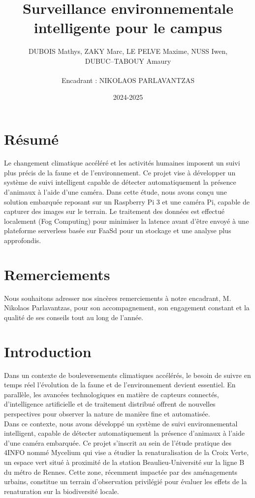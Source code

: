 \documentclass[a4paper,11pt]{article}
\title{\textbf{Surveillance environnementale intelligente pour le campus}}
\author{DUBOIS Mathys,	ZAKY Marc,	LE PELVE Maxime,	NUSS Iwen,\\	DUBUC--TABOUY Amaury
	\\ \\
	Encadrant : NIKOLAOS PARLAVANTZAS}
\date{2024-2025}                    %
\begin{document}
	
	\maketitle
	\section*{Résumé}
	Le changement climatique accéléré et les activités humaines imposent un suivi plus précis de la faune et de l'environnement. Ce projet vise à développer un système de suivi intelligent capable de détecter automatiquement la présence d'animaux à l'aide d'une caméra. Dans cette étude, nous avons conçu une solution embarquée reposant sur un Raspberry Pi 3 et une caméra Pi, capable de capturer des images sur le terrain. Le traitement des données est effectué localement (Fog Computing) pour minimiser la latence avant d'être envoyé à une plateforme serverless basée sur FaaSd pour un stockage et une analyse plus approfondis.
	
	
	\section{Remerciements}
	Nous souhaitons adresser nos sincères remerciements à notre encadrant, M. Nikolaos Parlavantzas, pour son accompagnement, son engagement constant et la qualité de ses conseils tout au long de l’année.
	
	\section{Introduction}
	Dans un contexte de bouleversements climatiques accélérés, le besoin de suivre en temps réel l’évolution de la faune et de l’environnement devient essentiel. En parallèle, les avancées technologiques en matière de capteurs connectés, d'intelligence artificielle et de traitement distribué offrent de nouvelles perspectives pour observer la nature de manière fine et automatisée.\\
	Dans ce contexte, nous avons développé un système de suivi environnemental intelligent, capable de détecter automatiquement la présence d’animaux à l’aide d’une caméra embarquée. Ce projet s’inscrit au sein de l'étude pratique des 4INFO nommé Mycelium qui vise a étudier la renaturalisation de la Croix Verte, un espace vert situé à proximité de la station Beaulieu-Université sur la ligne B du métro de Rennes. Cette zone, récemment impactée par des aménagements urbains, constitue un terrain d’observation privilégié pour évaluer les effets de la renaturation sur la biodiversité locale.
\end{document}
